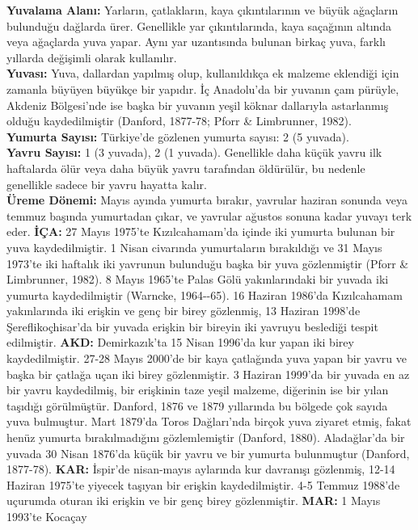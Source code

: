 \documentclass[
  a4paper,
  DIV=11,
  numbers=noendperiod]{scrreprt}
\begin{document}
\textbf{Yuvalama Alanı:} Yarların, çatlakların, kaya çıkıntılarının ve
büyük ağaçların bulunduğu dağlarda ürer. Genellikle yar çıkıntılarında,
kaya saçağının altında veya ağaçlarda yuva yapar. Aynı yar uzantısında
bulunan birkaç yuva, farklı yıllarda değişimli olarak kullanılır.\\
\textbf{Yuvası:} Yuva, dallardan yapılmış olup, kullanıldıkça ek malzeme
eklendiği için zamanla büyüyen büyükçe bir yapıdır. İç Anadolu'da bir
yuvanın çam pürüyle, Akdeniz Bölgesi'nde ise başka bir yuvanın yeşil
köknar dallarıyla astarlanmış olduğu kaydedilmiştir (Danford, 1877-78;
Pforr \& Limbrunner, 1982).\\
\textbf{Yumurta Sayısı:} Türkiye'de gözlenen yumurta sayısı: 2 (5
yuvada).\\
\textbf{Yavru Sayısı:} 1 (3 yuvada), 2 (1 yuvada). Genellikle daha küçük
yavru ilk haftalarda ölür veya daha büyük yavru tarafından öldürülür, bu
nedenle genellikle sadece bir yavru hayatta kalır.\\
\textbf{Üreme Dönemi:} Mayıs ayında yumurta bırakır, yavrular haziran
sonunda veya temmuz başında yumurtadan çıkar, ve yavrular ağustos sonuna
kadar yuvayı terk eder. \textbf{İÇA:} 27 Mayıs 1975'te Kızılcahamam'da
içinde iki yumurta bulunan bir yuva kaydedilmiştir. 1 Nisan civarında
yumurtaların bırakıldığı ve 31 Mayıs 1973'te iki haftalık iki yavrunun
bulunduğu başka bir yuva gözlenmiştir (Pforr \& Limbrunner, 1982). 8
Mayıs 1965'te Palas Gölü yakınlarındaki bir yuvada iki yumurta
kaydedilmiştir (Warncke, 1964-\/-65). 16 Haziran 1986'da Kızılcahamam
yakınlarında iki erişkin ve genç bir birey gözlenmiş, 13 Haziran 1998'de
Şereflikoçhisar'da bir yuvada erişkin bir bireyin iki yavruyu beslediği
tespit edilmiştir. \textbf{AKD:} Demirkazık'ta 15 Nisan 1996'da kur
yapan iki birey kaydedilmiştir. 27-28 Mayıs 2000'de bir kaya çatlağında
yuva yapan bir yavru ve başka bir çatlağa uçan iki birey gözlenmiştir. 3
Haziran 1999'da bir yuvada en az bir yavru kaydedilmiş, bir erişkinin
taze yeşil malzeme, diğerinin ise bir yılan taşıdığı görülmüştür.
Danford, 1876 ve 1879 yıllarında bu bölgede çok sayıda yuva bulmuştur.
Mart 1879'da Toros Dağları'nda birçok yuva ziyaret etmiş, fakat henüz
yumurta bırakılmadığını gözlemlemiştir (Danford, 1880). Aladağlar'da bir
yuvada 30 Nisan 1876'da küçük bir yavru ve bir yumurta bulunmuştur
(Danford, 1877-78). \textbf{KAR:} İspir'de nisan-mayıs aylarında kur
davranışı gözlenmiş, 12-14 Haziran 1975'te yiyecek taşıyan bir erişkin
kaydedilmiştir. 4-5 Temmuz 1988'de uçurumda oturan iki erişkin ve bir
genç birey gözlenmiştir. \textbf{MAR:} 1 Mayıs 1993'te Kocaçay
\end{document}

